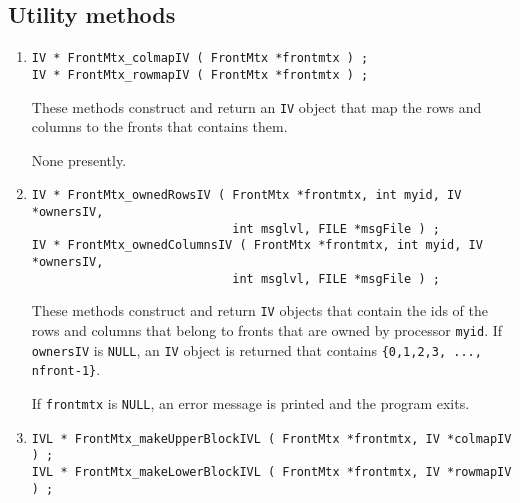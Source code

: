 \subsection{Utility methods}
\label{subsection:FrontMtx:proto:utility}
\par
\begin{enumerate}
\item
\begin{verbatim}
IV * FrontMtx_colmapIV ( FrontMtx *frontmtx ) ;
IV * FrontMtx_rowmapIV ( FrontMtx *frontmtx ) ;
\end{verbatim}
These methods construct and return an {\tt IV} object that map the
rows and columns to the fronts that contains them.
\par {}
None presently.
\item
\begin{verbatim}
IV * FrontMtx_ownedRowsIV ( FrontMtx *frontmtx, int myid, IV *ownersIV,
                            int msglvl, FILE *msgFile ) ;
IV * FrontMtx_ownedColumnsIV ( FrontMtx *frontmtx, int myid, IV *ownersIV,
                            int msglvl, FILE *msgFile ) ;
\end{verbatim}
These methods construct and return {\tt IV} objects that 
contain the ids of the rows and columns that belong to fronts that
are owned by processor {\tt myid}.
If {\tt ownersIV} is {\tt NULL}, an {\tt IV} object is returned
that contains {\tt \{0,1,2,3, ..., nfront-1\}}.
\par {}
If {\tt frontmtx} is {\tt NULL}, 
an error message is printed and the program exits.
\item
\begin{verbatim}
IVL * FrontMtx_makeUpperBlockIVL ( FrontMtx *frontmtx, IV *colmapIV ) ;
IVL * FrontMtx_makeLowerBlockIVL ( FrontMtx *frontmtx, IV *rowmapIV ) ;
\end{verbatim}

\end{enumerate}
